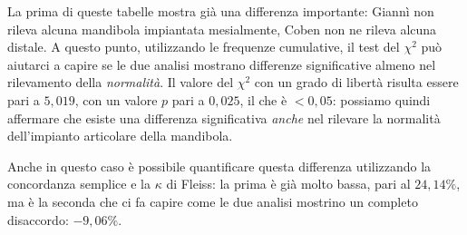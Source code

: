 La prima di queste tabelle mostra già una differenza importante: Giannì non rileva alcuna mandibola impiantata mesialmente, Coben non ne rileva alcuna distale. A questo punto, utilizzando le frequenze cumulative, il test del $\chi^2$ può aiutarci a capire se le due analisi mostrano differenze significative almeno nel rilevamento della \emph{normalità}. Il valore del $\chi^2$ con un grado di libertà risulta essere pari a $5,019$, con un valore $p$ pari a $0,025$, il che è $< 0,05$: possiamo quindi affermare che esiste una differenza significativa \emph{anche} nel rilevare la normalità dell'impianto articolare della mandibola.

Anche in questo caso è possibile quantificare questa differenza utilizzando la concordanza semplice e la $\kappa$ di Fleiss: la prima è già molto bassa, pari al $24,14\%$, ma è la seconda che ci fa capire come le due analisi mostrino un completo disaccordo: $-9,06\%$.
